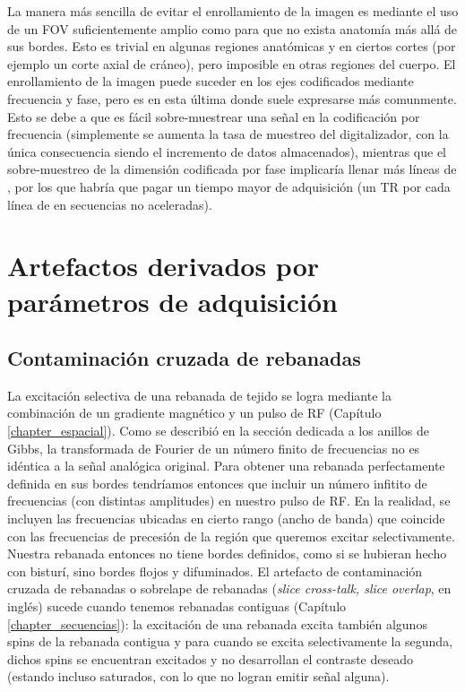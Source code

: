 La manera más sencilla de evitar el enrollamiento de la imagen es mediante el uso de un FOV suficientemente amplio como para que no exista anatomía más allá de sus bordes. Esto es trivial en algunas regiones anatómicas y en ciertos cortes (por ejemplo un corte axial de cráneo), pero imposible en otras regiones del cuerpo. El enrollamiento de la imagen puede suceder en los ejes codificados mediante frecuencia y fase, pero es en esta última donde suele expresarse más comunmente. Esto se debe a que es fácil sobre-muestrear una señal en la codificación por frecuencia (simplemente se aumenta la tasa de muestreo del digitalizador, con la única consecuencia siendo el incremento de datos almacenados), mientras que el sobre-muestreo de la dimensión codificada por fase implicaría llenar más líneas de \espaciok, por los que habría que pagar un tiempo mayor de adquisición (un TR por cada línea de \espaciok en secuencias no aceleradas). 


\section{Artefactos derivados por parámetros de adquisición}
\subsection{Contaminación cruzada de rebanadas}
La excitación selectiva de una rebanada de tejido se logra mediante la combinación de un gradiente magnético y un pulso de RF (Capítulo \ref{chapter_espacial}). Como se describió en la sección dedicada a los anillos de Gibbs, la transformada de Fourier de un número finito de frecuencias no es idéntica a la señal analógica original. Para obtener una rebanada perfectamente definida en sus bordes tendríamos entonces que incluir un número infitito de frecuencias (con distintas amplitudes) en nuestro pulso de RF. En la realidad, se incluyen las frecuencias ubicadas en cierto rango (ancho de banda) que coincide con las frecuencias de precesión de la región que queremos excitar selectivamente. Nuestra rebanada entonces no tiene bordes definidos, como si se hubieran hecho con bisturí, sino bordes flojos y difuminados. El artefacto de contaminación cruzada de rebanadas o sobrelape de rebanadas (\textit{slice cross-talk, slice overlap}, en inglés) sucede cuando tenemos rebanadas contiguas (Capítulo \ref{chapter_secuencias}): la excitación de una rebanada excita también algunos spins de la rebanada contigua y para cuando se excita selectivamente la segunda, dichos spins se encuentran excitados y no desarrollan el contraste deseado (estando incluso saturados, con lo que no logran emitir señal alguna). 

